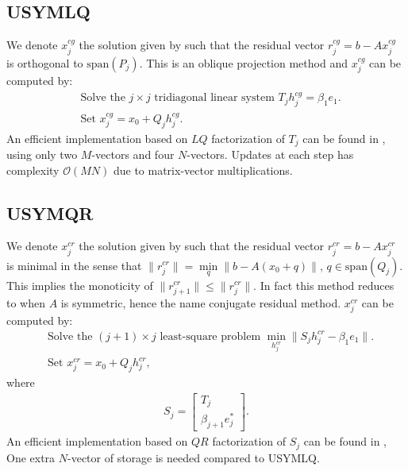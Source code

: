 \documentclass[10pt,letterpaper]{article}
\newcommand{\alg}[1]{\textproc{#1}}
\def\Span{\text{span}}
\begin{document}
\subsection{USYMLQ}
We denote $x_j^{cg}$ the solution given by \alg{USYMLQ} such that the 
residual vector $r_j^{cg} = b - A x_j^{cg}$ is orthogonal to 
$\Span(P_j)$. This is an oblique projection method and $x_j^{cg}$ can
be computed by: 
\begin{align} 
    & \text{Solve the $j\times j$ tridiagonal linear system 
            $T_j h_j^{cg} = \beta_1 e_1$}. \\
    & \text{Set $x_j^{cg} = x_0 + Q_j h_j^{cg}$}. 
\end{align}
An efficient implementation based on $LQ$ factorization of $T_j$ can
be found in \cite{saunders:1988}, using only two $M$-vectors and four
$N$-vectors. Updates at each step has complexity $\mathcal{O}(M N)$ due
to matrix-vector multiplications. 

\subsection{USYMQR}
We denote $x_j^{cr}$ the solution given by \alg{USYMQR} such that the 
residual vector $r_j^{cr} = b - A x_j^{cr}$ is minimal in the sense
that 
$\|r_j^{cr}\| = \min\limits_q\|b - A(x_0 + q)\|,\, q\in\Span(Q_j)$.
This implies the monoticity of $\|r_{j+1}^{cr}\| \leq \|r_{j}^{cr}\|$. 
In fact this method reduces to \alg{MINRES} when $A$ is symmetric, 
hence the name conjugate residual method. $x_j^{cr}$ can be computed
by: 
\begin{align} 
    & \text{Solve the $(j+1)\times j$ least-square problem
            $\min_{h_j^{cr}}\|S_j h_j^{cr} - \beta_1 e_1$}\|. \\
    & \text{Set $x_j^{cr} = x_0 + Q_j h_j^{cr}$},
\end{align}
where 
\begin{align}
    S_j = \begin{bmatrix}
        T_j \\
        \beta_{j+1}e_j^*
    \end{bmatrix}.
\end{align}
An efficient implementation based on $QR$ factorization of $S_j$ can
be found in \cite{saunders:1988}, One extra $N$-vector of storage is 
needed compared to USYMLQ.

\end{document}
